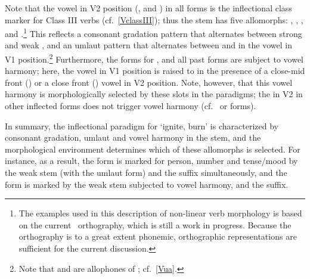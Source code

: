 Note that the vowel in V2 position (,  and ) in all forms is the inflectional class marker for Class III verbs (cf.~\SEC\ref{VclassIII}); thus the stem has five allomorphs: , , \mbox{,}  and .\footnote{The examples used in this description of non-linear verb morphology is based on the current \PS\ orthography, which is still a work in progress. Because the orthography is to a great extent phonemic, orthographic representations are sufficient for the current discussion.} 
This reflects a consonant gradation pattern that alternates between strong  and weak , and an umlaut pattern that alternates between  and  in the vowel in V1 position.\footnote{Note that  and  are allophones of ; cf.~\SEC\ref{Vua}.} 
Furthermore, the forms for ,  and all past forms are subject to vowel harmony; here, the vowel in V1 position is raised to  in the presence of a close-mid front () or a close front () vowel in V2 position. Note, however, that this vowel harmony is morphologically selected by these slots in the paradigms; the  in V2 in other inflected forms does not trigger vowel harmony (cf.~ or  forms). 


In summary, the inflectional paradigm for  ‘ignite, burn’ is characterized by consonant gradation, umlaut and vowel harmony in the stem, and the morphological environment determines which of these allomorphs is selected. %
For instance, as a result, the  form  is marked for person, number and tense/mood by the weak  stem (with the  umlaut form) and the  suffix simultaneously, and the  form  is marked by the weak  stem subjected to vowel harmony, and the  suffix. 

